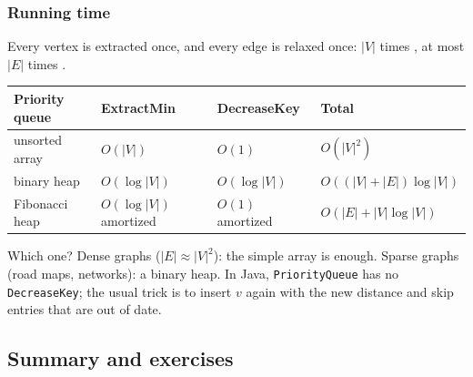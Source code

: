 \documentclass[aspectratio=169,10pt,compress]{beamer}
\begin{document}
\begin{frame}[t,fragile] \frametitle{Running time}
  Every vertex is extracted once, and every edge is relaxed once:
  $|V|$ times \FExtractMin, at most $|E|$ times \FDecreaseKey.

  \vspace{0.5em}
  \small
  \begin{tabular}{@{}L{0.26\textwidth}L{0.16\textwidth}L{0.16\textwidth}L{0.3\textwidth}@{}}
    \toprule
    \textbf{Priority queue} & \textbf{ExtractMin} & \textbf{DecreaseKey} & \textbf{Total} \\
    \midrule
    unsorted array    & $O(|V|)$      & $O(1)$             & $O(|V|^{2})$ \\
    binary heap       & $O(\log |V|)$ & $O(\log |V|)$      & $O((|V| + |E|) \log |V|)$ \\
    Fibonacci heap    & $O(\log |V|)$ amortized & $O(1)$ amortized & $O(|E| + |V| \log |V|)$ \\
    \bottomrule
  \end{tabular}

  \vspace{0.8em}
  \normalsize
  \begin{block}{Which one?}
    \small Dense graphs ($|E| \approx |V|^{2}$): the simple array is enough.
    Sparse graphs (road maps, networks): a binary heap. In Java, \texttt{PriorityQueue}
    has no \texttt{DecreaseKey}; the usual trick is to insert $v$ again with the new distance
    and skip entries that are out of date.
  \end{block}
\end{frame}


\subsection[Summary]{Summary and exercises}
\end{document}
